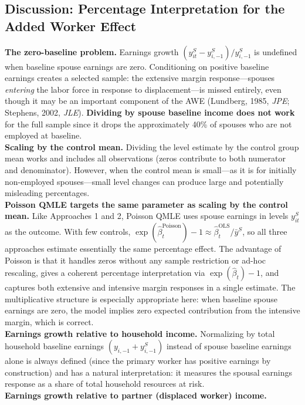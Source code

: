\documentclass{article}
\begin{document}
\begin{itemize}
\subsection*{Discussion: Percentage Interpretation for the Added Worker Effect}
\textbf{The zero-baseline problem.}
Earnings growth $ (y_{it}^S - y_{i,-1}^S) / y_{i,-1}^S$ is undefined when baseline spouse
earnings are zero. Conditioning on positive baseline earnings creates a selected sample:
the extensive margin response---spouses \textit{entering} the labor force in response to
displacement---is missed entirely, even though it may be an important component
of the AWE (Lundberg, 1985, \textit{JPE}; Stephens, 2002, \textit{JLE}).
\textbf{Dividing by spouse baseline income does not work} for the full sample since it
drops the approximately 40\% of spouses who are not employed at baseline.
\\
\textbf{Scaling by the control mean.}
Dividing the level estimate by the control group mean works and includes all observations
(zeros contribute to both numerator and denominator). However, when the control mean is
small---as it is for initially non-employed spouses---small level changes can produce
large and potentially misleading percentages.
\\
\textbf{Poisson QMLE targets the same parameter as scaling by the control mean.}
Like Approaches 1 and 2, Poisson QMLE uses spouse earnings in levels $ y_{it}^S$ as the outcome.
With few controls, $ \exp(\hat{\beta}^{\text{Poisson}}_t) - 1 \approx \hat{\beta}^{\text{OLS}}_t / \bar{y}^S$,
so all three approaches estimate essentially the same percentage effect.
The advantage of Poisson is that it handles zeros without any sample restriction or ad-hoc rescaling,
gives a coherent percentage interpretation via $ \exp(\hat{\beta}_t) - 1$, and captures both extensive and
intensive margin responses in a single estimate. The multiplicative structure is especially
appropriate here: when baseline spouse earnings are zero, the model implies zero expected
contribution from the intensive margin, which is correct.
\\
\textbf{Earnings growth relative to household income.}
Normalizing by total household baseline earnings
$ (y_{i,-1} + y_{i,-1}^S)$ instead of spouse baseline earnings alone
is always defined (since the primary worker has positive earnings by construction)
and has a natural interpretation: it measures the spousal earnings response as a share of
total household resources at risk.
\\
\textbf{Earnings growth relative to partner (displaced worker) income.}

\end{itemize}
\end{document}
